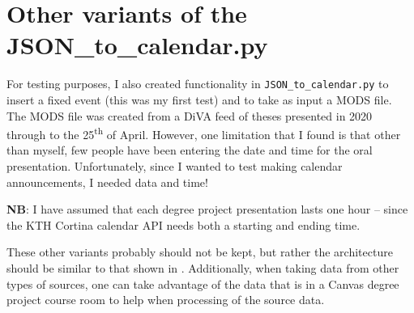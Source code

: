 \section{Other variants of the JSON\_to\_calendar.py}
\label{sec:otherVariantsofJSONtoCalendar}
For testing purposes, I also created functionality in \texttt{JSON\_to\_calendar.py} to insert a fixed event (this was my first test) and to take as input a MODS file. The MODS file was created from a DiVA feed of theses presented in 2020 through to the 25\textsuperscript{th} of April. However, one limitation that I found is that other than myself, few people have been entering the date and time for the oral presentation. Unfortunately, since I wanted to test making calendar announcements, I needed data and time!

\textbf{NB}: I have assumed that each degree project presentation lasts one hour – since the KTH Cortina calendar API needs both a starting and ending time.

These other variants probably should not be kept, but rather the architecture should be similar to that shown in . Additionally, when taking data from other types of sources, one can take advantage of the data that is in a Canvas degree project course room to help when processing of the source data.

